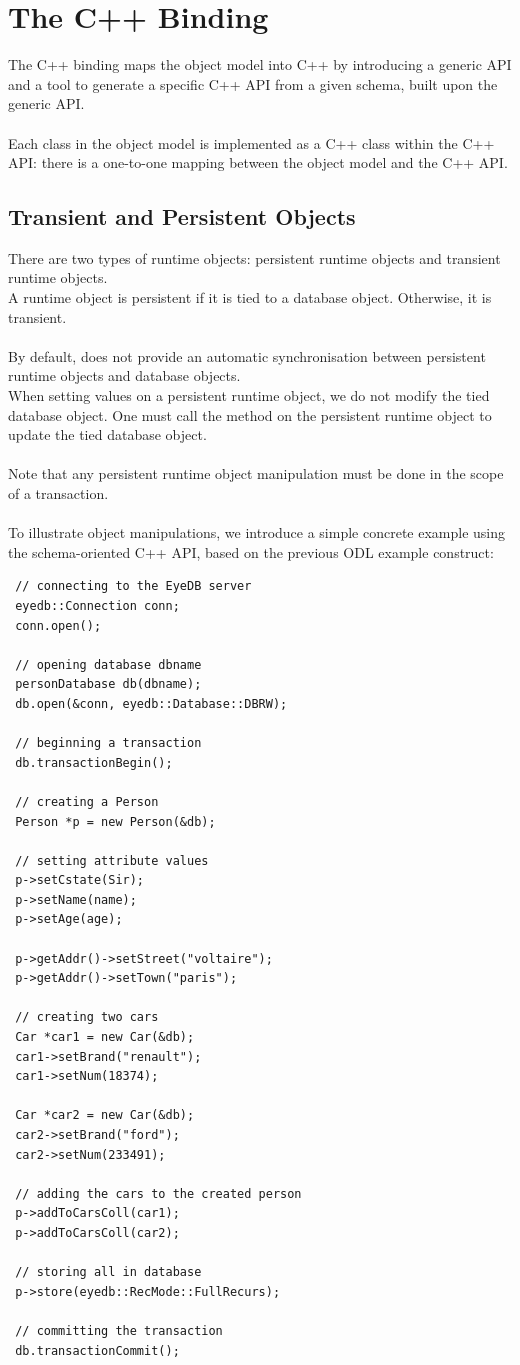 \section{The C++ Binding}
The C++ binding maps the \eyedb object model into C++ by introducing
a generic API and a tool to generate a specific C++ API from
a given schema, built upon the generic API.
\\
\\
Each class in the \eyedb object model is implemented as a C++
class within the C++ API: there is a one-to-one mapping between
the object model and the C++ API.

\subsection{Transient and Persistent Objects}
There are two types of runtime objects: persistent runtime objects and
transient runtime objects.
\\
A runtime object is persistent if it is tied to a database object.
Otherwise, it is  transient.
\\
\\
By default, \eyedb does not
provide an automatic synchronisation between persistent runtime objects
and database objects.
\\
When setting values on a persistent runtime object, we do not modify
the tied database object.
One must call the  method on the persistent runtime object
to update the tied database object.
\\
\\
Note that any persistent runtime object manipulation must be done
in the scope of a transaction.
\\
\\
To illustrate object manipulations, we introduce a simple concrete
example using the schema-oriented C++ API, based on the previous ODL
example construct:
{\verbsize
\begin{verbatim}
 // connecting to the EyeDB server
 eyedb::Connection conn;
 conn.open();

 // opening database dbname
 personDatabase db(dbname);
 db.open(&conn, eyedb::Database::DBRW);

 // beginning a transaction
 db.transactionBegin();

 // creating a Person
 Person *p = new Person(&db);

 // setting attribute values
 p->setCstate(Sir);
 p->setName(name);
 p->setAge(age);

 p->getAddr()->setStreet("voltaire");
 p->getAddr()->setTown("paris");

 // creating two cars
 Car *car1 = new Car(&db);
 car1->setBrand("renault");
 car1->setNum(18374);

 Car *car2 = new Car(&db);
 car2->setBrand("ford");
 car2->setNum(233491);

 // adding the cars to the created person
 p->addToCarsColl(car1);
 p->addToCarsColl(car2);

 // storing all in database
 p->store(eyedb::RecMode::FullRecurs);

 // committing the transaction
 db.transactionCommit();
\end{verbatim}
}
